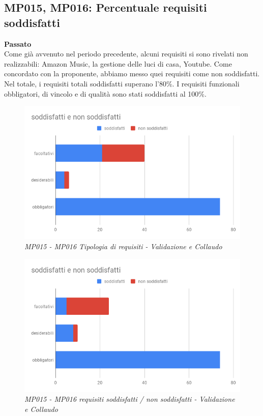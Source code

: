 \subsection{MP015, MP016: Percentuale requisiti soddisfatti}
\textbf{Passato}\\
Come già avvenuto nel periodo precedente, alcuni requisiti si sono rivelati non realizzabili: Amazon Music, la gestione delle luci di casa, Youtube. Come concordato con la proponente, abbiamo messo quei requisiti come non soddisfatti.\\
Nel totale, i requisiti totali soddisfatti superano l'80\%. I requisiti funzionali obbligatori, di vincolo e di qualità sono stati soddisfatti al 100\%. 
\begin{figure} [H]
    \centering
	\includegraphics[scale=0.5]{./images/RA_reqg.png}
    \caption{\textit{MP015 - MP016 Tipologia di requisiti - Validazione e Collaudo}}
\end{figure}
\begin{figure} [H]
    \centering
	\includegraphics[scale=0.5]{./images/RA_totsod.png}
    \caption{\textit{MP015 - MP016  requisiti soddisfatti / non soddisfatti - Validazione e Collaudo}}
\end{figure}
